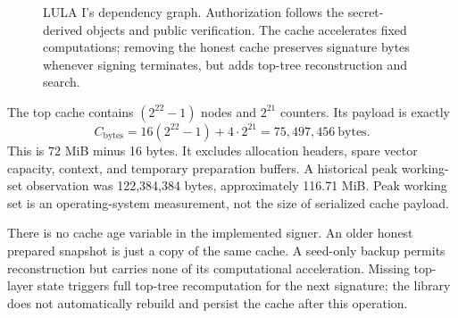 \documentclass[a4paper,envcountsame,runningheads]{llncs}
\begin{document}
\begin{figure}[!htbp]
\centering
{}
\caption{LULA I's dependency graph. Authorization follows the secret-derived objects and public verification. The cache accelerates fixed computations; removing the honest cache preserves signature bytes whenever signing terminates, but adds top-tree reconstruction and search.}\label{fig:dependency}
\end{figure}

The top cache contains $(2^{22}-1)$ nodes and $2^{21}$ counters. Its payload is exactly
\begin{equation}\label{eq:cache}
 C_{\mathrm{bytes}}=16(2^{22}-1)+4\cdot2^{21}
 =75{,}497{,}456\ \mathrm{bytes}.
\end{equation}
This is $72$ MiB minus 16 bytes. It excludes allocation headers, spare vector capacity, context, and temporary preparation buffers. A historical peak working-set observation was 122,384,384 bytes, approximately 116.71 MiB. Peak working set is an operating-system measurement, not the size of serialized cache payload.

There is no cache age variable in the implemented signer. An older honest prepared snapshot is just a copy of the same cache. A seed-only backup permits reconstruction but carries none of its computational acceleration. Missing top-layer state triggers full top-tree recomputation for the next signature; the library does not automatically rebuild and persist the cache after this operation.
\end{document}

